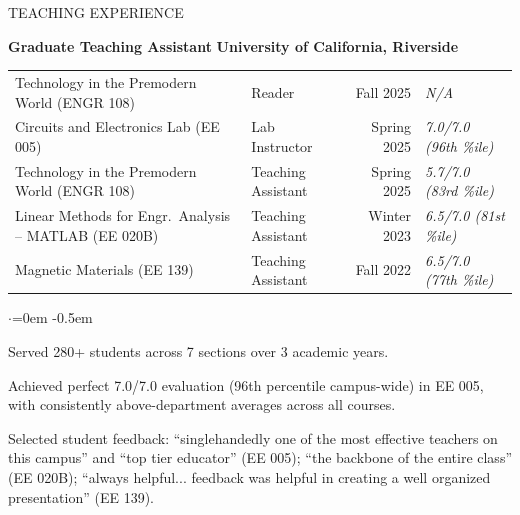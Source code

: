 \documentclass{resume} %
\begin{document}
\begin{rSection}{TEACHING EXPERIENCE}

{\bf Graduate Teaching Assistant} \hfill {\bf University of California, Riverside}

\vspace{0.3em}
\begin{tabular}{ @{} p{8.5cm} l r l }
Technology in the Premodern World (ENGR 108) & Reader & Fall 2025 & \textit{N/A} \\
Circuits and Electronics Lab (EE 005) & Lab Instructor & Spring 2025 & \textit{7.0/7.0 (96th \%ile)} \\
Technology in the Premodern World (ENGR 108) & Teaching Assistant & Spring 2025 & \textit{5.7/7.0 (83rd \%ile)} \\
Linear Methods for Engr.\ Analysis -- MATLAB (EE 020B) & Teaching Assistant & Winter 2023 & \textit{6.5/7.0 (81st \%ile)} \\
Magnetic Materials (EE 139) & Teaching Assistant & Fall 2022 & \textit{6.5/7.0 (77th \%ile)} \\
\end{tabular}
\vspace{0.3em}

\begin{list}{$\cdot$}{\leftmargin=0em}
\itemsep -0.5em \vspace{-0.5em}
\item Served 280+ students across 7 sections over 3 academic years.
\item Achieved perfect 7.0/7.0 evaluation (96th percentile campus-wide) in EE 005, with consistently above-department averages across all courses.
\item Selected student feedback: ``singlehandedly one of the most effective teachers on this campus'' and ``top tier educator'' (EE 005); ``the backbone of the entire class'' (EE 020B); ``always helpful... feedback was helpful in creating a well organized presentation'' (EE 139).
\end{list}
\vspace{0.5em}

\end{rSection}

\end{document}
